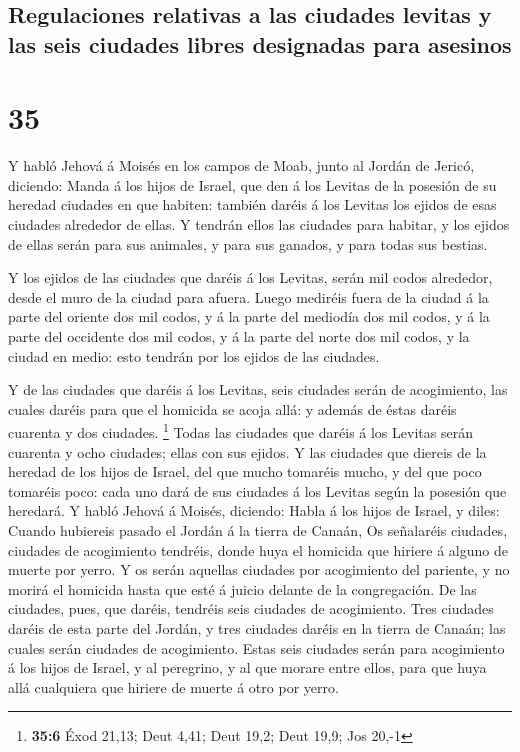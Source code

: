 \hypertarget{regulaciones-relativas-a-las-ciudades-levitas-y-las-seis-ciudades-libres-designadas-para-asesinos}{%
\subsection{Regulaciones relativas a las ciudades levitas y las seis
ciudades libres designadas para
asesinos}\label{regulaciones-relativas-a-las-ciudades-levitas-y-las-seis-ciudades-libres-designadas-para-asesinos}}

\hypertarget{section-34}{%
\section{35}\label{section-34}}

 Y habló Jehová á Moisés en los campos de Moab, junto al
Jordán de Jericó, diciendo:  Manda á los hijos de Israel,
que den á los Levitas de la posesión de su heredad ciudades en que
habiten: también daréis á los Levitas los ejidos de esas ciudades
alrededor de ellas.  Y tendrán ellos las ciudades para
habitar, y los ejidos de ellas serán para sus animales, y para sus
ganados, y para todas sus bestias.

 Y los ejidos de las ciudades que daréis á los Levitas,
serán mil codos alrededor, desde el muro de la ciudad para afuera.
 Luego mediréis fuera de la ciudad á la parte del oriente
dos mil codos, y á la parte del mediodía dos mil codos, y á la parte del
occidente dos mil codos, y á la parte del norte dos mil codos, y la
ciudad en medio: esto tendrán por los ejidos de las ciudades.

 Y de las ciudades que daréis á los Levitas, seis ciudades
serán de acogimiento, las cuales daréis para que el homicida se acoja
allá: y además de éstas daréis cuarenta y dos ciudades. \footnote{\textbf{35:6}
  Éxod 21,13; Deut 4,41; Deut 19,2; Deut 19,9; Jos 20,-1} 
Todas las ciudades que daréis á los Levitas serán cuarenta y ocho
ciudades; ellas con sus ejidos.  Y las ciudades que diereis
de la heredad de los hijos de Israel, del que mucho tomaréis mucho, y
del que poco tomaréis poco: cada uno dará de sus ciudades á los Levitas
según la posesión que heredará.  Y habló Jehová á Moisés,
diciendo:  Habla á los hijos de Israel, y diles: Cuando
hubiereis pasado el Jordán á la tierra de Canaán,  Os
señalaréis ciudades, ciudades de acogimiento tendréis, donde huya el
homicida que hiriere á alguno de muerte por yerro.  Y os
serán aquellas ciudades por acogimiento del pariente, y no morirá el
homicida hasta que esté á juicio delante de la congregación.
 De las ciudades, pues, que daréis, tendréis seis ciudades
de acogimiento.  Tres ciudades daréis de esta parte del
Jordán, y tres ciudades daréis en la tierra de Canaán; las cuales serán
ciudades de acogimiento.  Estas seis ciudades serán para
acogimiento á los hijos de Israel, y al peregrino, y al que morare entre
ellos, para que huya allá cualquiera que hiriere de muerte á otro por
yerro.

